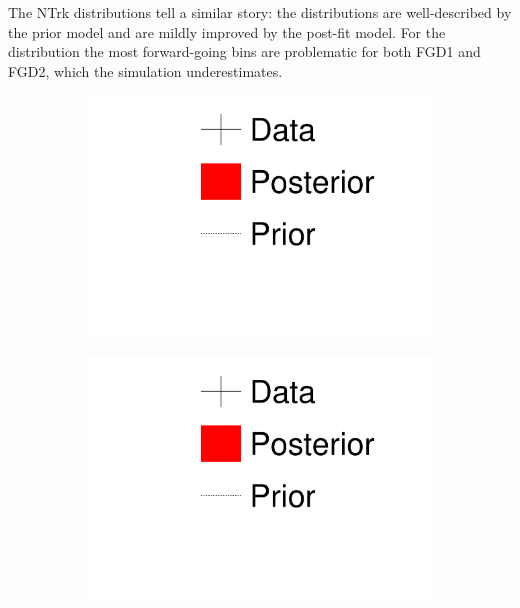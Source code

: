 The NTrk distributions tell a similar story: the \pmu distributions are well-described by the prior model and are mildly improved by the post-fit model. For the \cosmu distribution the most forward-going bins are problematic for both FGD1 and FGD2, which the simulation underestimates.
\begin{figure}[h]
	\begin{subfigure}[t]{0.2\textwidth}
		\includegraphics[width=\textwidth, trim={0mm 90mm 0mm 0mm}, clip,page=1]{figures/mach3/1D_legend_Data_Posterior_Prior}
	\end{subfigure}
	\begin{subfigure}[t]{0.2\textwidth}
		\includegraphics[width=\textwidth, trim={0mm 45mm 0mm 50mm}, clip,page=1]{figures/mach3/1D_legend_Data_Posterior_Prior}
	\end{subfigure}	

\end{figure}
